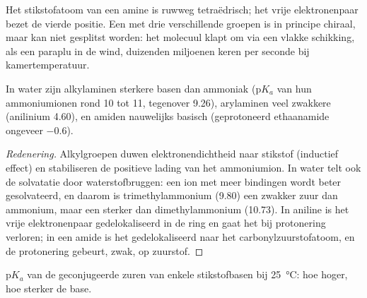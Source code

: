 Het stikstofatoom van een amine is ruwweg tetraëdrisch; het vrije elektronenpaar bezet de vierde
positie. Een  met drie verschillende groepen is in principe chiraal, maar kan niet
gesplitst worden: het molecuul klapt om via een vlakke schikking, als een paraplu in de wind,
duizenden miljoenen keren per seconde bij kamertemperatuur.

\begin{proposition}[Basiciteit]\label{prop:b2:amines:basicity}
In water zijn alkylaminen sterkere basen dan ammoniak ($\mathrm pK_a$ van hun ammoniumionen
rond 10 tot 11, tegenover 9.26), arylaminen veel zwakkere (anilinium 4.60), en amiden nauwelijks
basisch (geprotoneerd ethaanamide ongeveer $-0.6$).
\end{proposition}

\begin{proof}[Redenering]
Alkylgroepen duwen elektronendichtheid naar stikstof (inductief effect) en stabiliseren de
positieve lading van het ammoniumion. In water telt ook de solvatatie door waterstofbruggen: een
ion met meer bindingen  wordt beter gesolvateerd, en daarom is trimethylammonium (9.80) een
zwakker zuur dan ammonium, maar een sterker dan dimethylammonium (10.73). In aniline is het vrije
elektronenpaar gedelokaliseerd in de ring en gaat het bij protonering verloren; in een amide is het gedelokaliseerd
naar het carbonylzuurstofatoom, en de protonering gebeurt, zwak, op zuurstof.
\end{proof}

\begin{omfigure}

{\small $\mathrm pK_a$ van de geconjugeerde zuren van enkele stikstofbasen bij
\qty{25}{\degreeCelsius}: hoe hoger, hoe sterker de base.}
\end{omfigure}

